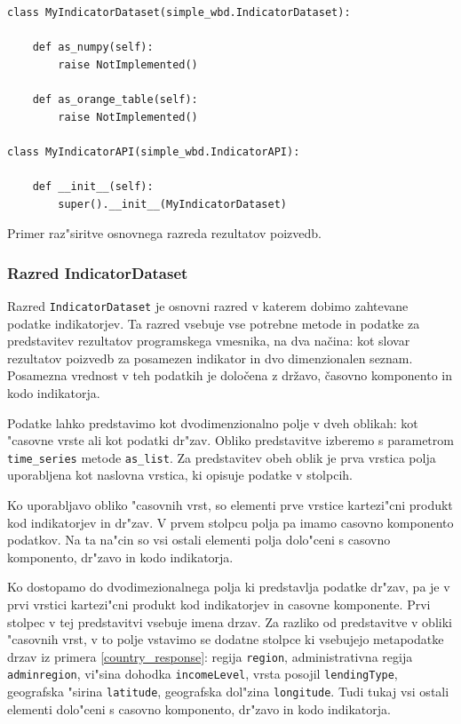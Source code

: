 \begin{snippet}
\begin{center}
\begin{lstlisting}
class MyIndicatorDataset(simple_wbd.IndicatorDataset):
    
    def as_numpy(self):
        raise NotImplemented()
    
    def as_orange_table(self):
        raise NotImplemented()

class MyIndicatorAPI(simple_wbd.IndicatorAPI):

    def __init__(self):
        super().__init__(MyIndicatorDataset)
\end{lstlisting}
\end{center}
\caption[some]{Primer raz"siritve osnovnega razreda rezultatov poizvedb.}
\label{indicator_api_extend}
\end{snippet} 


\subsubsection{Razred IndicatorDataset}

Razred \verb|IndicatorDataset| je osnovni razred v katerem dobimo zahtevane 
podatke indikatorjev. Ta razred vsebuje vse potrebne metode in podatke za 
predstavitev rezultatov programskega vmesnika, na dva načina: kot slovar
rezultatov poizvedb za posamezen indikator in dvo dimenzionalen seznam. 
Posamezna vrednost v teh podatkih je določena z državo, časovno komponento in 
kodo indikatorja. 

Podatke lahko predstavimo kot dvodimenzionalno polje v dveh oblikah: kot
"casovne vrste ali kot podatki dr"zav. Obliko predstavitve izberemo s
parametrom \verb|time_series| metode \verb|as_list|. Za predstavitev obeh oblik
je prva vrstica polja uporabljena kot naslovna vrstica, ki opisuje podatke v 
stolpcih.

Ko uporabljavo obliko "casovnih vrst, so elementi prve vrstice kartezi"cni
produkt kod indikatorjev in dr"zav. V prvem stolpcu polja pa imamo casovno
komponento podatkov. Na ta na"cin so vsi ostali elementi polja dolo"ceni s 
casovno komponento, dr"zavo in kodo indikatorja.

Ko dostopamo do dvodimezionalnega polja ki predstavlja podatke dr"zav, pa je v
prvi vrstici kartezi"cni produkt kod indikatorjev in casovne komponente. Prvi
stolpec v tej predstavitvi vsebuje imena drzav. Za razliko od predstavitve v 
obliki "casovnih vrst, v to polje vstavimo se dodatne stolpce ki vsebujejo
metapodatke drzav iz primera \ref{country_response}: regija \verb|region|, administrativna regija
\verb|adminregion|, vi"sina dohodka \verb|incomeLevel|, vrsta posojil
\verb|lendingType|, geografska "sirina \verb|latitude|, geografska dol"zina
\verb|longitude|. Tudi tukaj vsi ostali elementi dolo"ceni s casovno 
komponento, dr"zavo in kodo indikatorja. 

